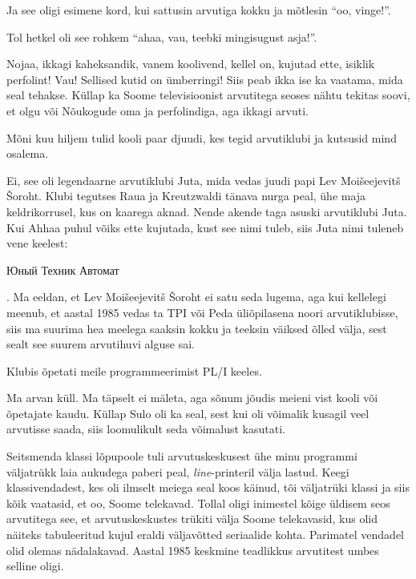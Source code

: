 Ja see oligi esimene kord, kui sattusin arvutiga kokku ja mõtlesin 
\enquote{oo, vinge!}.


Tol hetkel oli see rohkem \enquote{ahaa, vau, teebki 
mingisugust asja!}. 


Nojaa, ikkagi kaheksandik, vanem koolivend, kellel on, kujutad 
ette, isiklik perfolint! Vau! Sellised kutid on ümberringi! Siis peab 
ikka ise ka vaatama, mida seal tehakse. Küllap ka Soome televisioonist 
arvutitega seoses nähtu tekitas soovi, et olgu või 
Nõukogude oma ja perfolindiga, aga ikkagi arvuti. 

Mõni kuu hiljem tulid kooli paar djuudi, kes tegid arvutiklubi ja 
kutsusid mind osalema. 


Ei, see oli legendaarne arvutiklubi Juta, mida vedas 
juudi papi Lev Moišeejevitš Šoroht. Klubi 
tegutses Raua ja Kreutzwaldi tänava nurga peal, ühe maja keldrikorrusel, kus on kaarega 
aknad. Nende akende taga asuski arvutiklubi Juta. Kui 
Ahhaa puhul võiks ette kujutada, kust see nimi tuleb, siis 
Juta nimi tuleneb vene keelest: \begin{russian}Юный Техник 
Автомат\end{russian}. Ma eeldan, et Lev Moišeejevitš Šoroht ei satu seda 
lugema, aga kui kellelegi meenub, et aastal 1985 vedas ta TPI või Peda 
üliõpilasena noori arvutiklubisse, siis ma suurima hea 
meelega saaksin kokku ja teeksin väiksed õlled välja, sest sealt see suurem arvutihuvi alguse sai. 

Klubis õpetati meile programmeerimist PL/I keeles.


Ma arvan küll. Ma täpselt ei mäleta, aga sõnum jõudis 
meieni vist kooli või õpetajate kaudu. Küllap Sulo oli ka seal, 
sest kui oli võimalik kusagil veel arvutisse saada, siis loomulikult seda võimalust 
kasutati.


Seitsmenda klassi lõpupoole tuli arvutuskeskusest ühe minu 
programmi väljatrükk laia aukudega paberi peal, \emph{line}-printeril 
välja lastud. Keegi klassivendadest, kes oli ilmselt meiega seal 
koos käinud, tõi väljatrüki klassi ja siis kõik vaatasid, et 
oo, Soome telekavad. Tollal oligi inimestel kõige 
üldisem seos arvutitega see, et arvutuskeskustes trükiti välja Soome 
telekavasid, kus olid näiteks tabuleeritud kujul eraldi väljavõtted 
seriaalide kohta. Parimatel vendadel olid olemas nädalakavad. Aastal 1985 
keskmine teadlikkus arvutitest umbes selline oligi.

